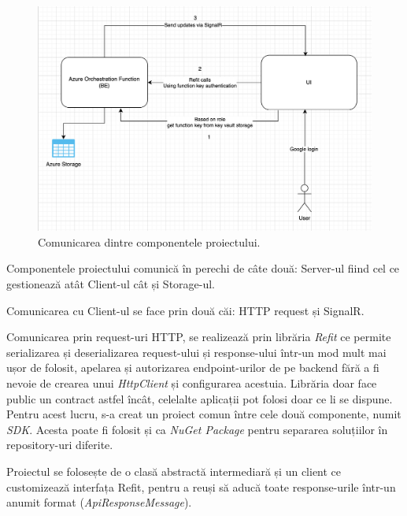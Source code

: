 \begin{figure}[H]
    \centering
    \includegraphics[width=16cm]{Assets/componentsComunication.png}
    \caption{Comunicarea dintre componentele proiectului.}
    \label{fig:componentsComunication}
\end{figure}

Componentele proiectului comunică în perechi de câte două: Server-ul fiind
cel ce gestionează atât Client-ul cât și Storage-ul.

Comunicarea cu Client-ul se face prin două căi: HTTP request și SignalR.

Comunicarea prin request-uri HTTP, se realizează prin librăria \textit{Refit} ce permite
serializarea și deserializarea request-ului și response-ului într-un mod mult mai ușor de folosit,
apelarea și autorizarea endpoint-urilor de pe backend fără a fi nevoie de crearea unui \textit{HttpClient}
și configurarea acestuia. Librăria doar face public un contract astfel încât, celelalte aplicații pot folosi doar ce li se dispune.
Pentru acest lucru, s-a creat un proiect comun între cele două componente, numit \textit{SDK}.
Acesta poate fi folosit și ca \textit{NuGet Package} pentru separarea soluțiilor în repository-uri diferite.

Proiectul se folosește de o clasă abstractă intermediară și un client ce customizează interfața Refit,
pentru a reuși să aducă toate response-urile într-un anumit format (\textit{ApiResponseMessage}).

